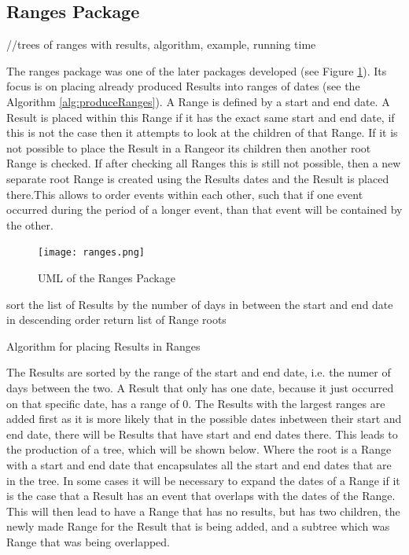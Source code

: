 \subsection{Ranges Package}
//trees of ranges with results, algorithm, example, running time
\par The ranges package was one of the later packages developed (see Figure \ref{fig:ranges}). Its focus is on placing already produced Results into ranges of dates (see the Algorithm \ref{alg:produceRanges}). A Range is defined by a start and end date. A Result is placed within this Range if it has the exact same start and end date, if this is not the case then it attempts to look at the children of that Range. If it is not possible to place the Result in a Rangeor its children then another root Range is checked. If after checking all Ranges this is still not possible, then a new separate root Range is created using the Results dates and the Result is placed there.This allows to order events within each other, such that if one event occurred during the period of a longer event, than that event will be contained by the other. 
\begin{figure}[H]
\caption{UML of the Ranges Package}
\label{fig:ranges}
\texttt{[image: ranges.png]}
\centering
\end{figure}
\begin{algorithm}
sort the list of Results by the number of days in between the start and end date in descending order\;
return list of Range roots\;
\caption{Algorithm for placing Results in Ranges}
\label{alg:produceRanges}
\end{algorithm}
\par The Results are sorted by the range of the start and end date, i.e. the numer of days between the two. A Result that only has one date, because it just occurred on that specific date, has a range of 0. The Results with the largest ranges are added first as it is more likely that in the possible dates inbetween their start and end date, there will be Results that have start and end dates there. This leads to the production of a tree, which will be shown below. Where the root is a Range with a start and end date that encapsulates all the start and end dates that are in the tree. In some cases it will be necessary to expand the dates of a Range if it is the case that a Result has an event that overlaps with the dates of the Range. This will then lead to have a Range that has no results, but has two children, the newly made Range for the Result that is being added, and a subtree which was Range that was being overlapped.
